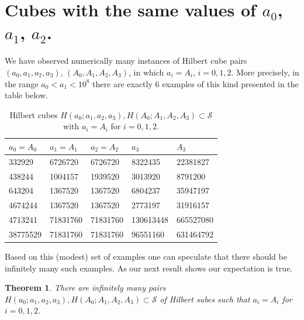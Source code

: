 \documentclass[10pt]{amsart}
\theoremstyle{plain}
\newtheorem{thm}{Theorem}[section]
\def\cal{\mathcal}
\begin{document}
\section{Cubes with the same values of $a_0$, $a_1$, $a_2$.}
We have observed numerically many instances of Hilbert cube pairs $(a_0,a_1,a_2,a_3)$, $(A_0,A_1,A_2,A_3)$, in which $a_i=A_i$, $i=0,1,2$. More precisely, in the range $a_{0}<a_{1}<10^8$ there are exactly 6 examples of this kind presented in the table below.
\begin{table}[htbp]
\centering
\begin{tabular}{|l|l|l|l|l|}
\hline
$a_{0}=A_{0}$ & $a_{1}=A_{1}$ & $a_{2}=A_{2}$ & $a_{3}$ & $A_{3}$ \\
\hline
332929  & 6726720  & 6726720  & 8322435   & 22381827 \\
438244  & 1004157  & 1939520  & 3013920   & 8791200  \\
643204  & 1367520  & 1367520  & 6804237   & 35947197 \\
4674244 & 1367520  & 1367520  & 2773197   & 31916157 \\
4713241 & 71831760 & 71831760 & 130613448 & 665527080 \\
38775529 & 71831760 & 71831760 & 96551160  & 631464792 \\
\hline
\end{tabular}
\caption{ Hilbert cubes $H(a_0; a_1, a_2, a_3), H(A_0; A_1, A_2, A_3)\subset \cal{S}$ with $a_{i}=A_{i}$ for $i=0, 1, 2$.}
\end{table}
 Based on this (modest) set of examples one can speculate that there should be infinitely many such examples. As our next result shows our expectation is true.
\begin{thm}
    There are infinitely many pairs $H(a_{0}; a_{1}, a_{2}, a_{3}), H(A_0; A_1, A_2, A_3)\subset \cal{S}$ of Hilbert subes such that $a_{i}=A_{i}$ for $i=0, 1, 2$.
\end{thm}
\end{document}
